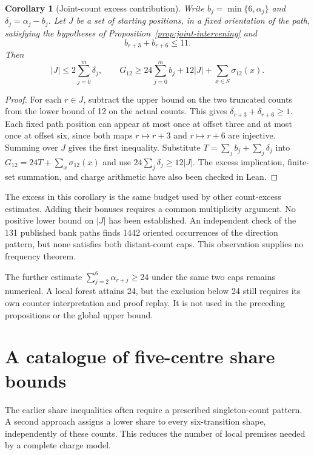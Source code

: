 \documentclass[11pt,a4paper]{article}
\newtheorem{corollary}[theorem]{Corollary}
\theoremstyle{definition}
\theoremstyle{remark}
\begin{document}
\begin{corollary}[Joint-count excess contribution]\label{cor:joint-intervening-excess}
Write $b_j=\min\{6,\alpha_j\}$ and $\delta_j=\alpha_j-b_j$. Let $J$ be a set of starting positions, in a fixed orientation of the path, satisfying the hypotheses of Proposition~\ref{prop:joint-intervening} and
\[
b_{r+3}+b_{r+6}\le11.
\]
Then
\[
|J|\le2\sum_{j=0}^{m}\delta_j,
\qquad
G_{12}\ge24\sum_{j=0}^{m}b_j+12|J|+\sum_{x\in S}\sigma_{12}(x).
\]
\end{corollary}
\begin{proof}
For each $r\in J$, subtract the upper bound on the two truncated counts from the lower bound of 12 on the actual counts. This gives $\delta_{r+3}+\delta_{r+6}\ge1$. Each fixed path position can appear at most once at offset three and at most once at offset six, since both maps $r\mapsto r+3$ and $r\mapsto r+6$ are injective. Summing over $J$ gives the first inequality. Substitute $T=\sum_j b_j+\sum_j\delta_j$ into $G_{12}=24T+\sum_x\sigma_{12}(x)$ and use $24\sum_j\delta_j\ge12|J|$. The excess implication, finite-set summation, and charge arithmetic have also been checked in Lean.
\end{proof}

The excess in this corollary is the same budget used by other count-excess estimates. Adding their bonuses requires a common multiplicity argument. No positive lower bound on $|J|$ has been established. An independent check of the 131 published bank paths finds 1442 oriented occurrences of the direction pattern, but none satisfies both distant-count caps. This observation supplies no frequency theorem.

The further estimate $\sum_{j=2}^{6}\alpha_{r+j}\ge24$ under the same two caps remains numerical. A local forest attains 24, but the exclusion below 24 still requires its own counter interpretation and proof replay. It is not used in the preceding propositions or the global upper bound.

\section{A catalogue of five-centre share bounds}\label{sec:countfree-catalogue}
The earlier share inequalities often require a prescribed singleton-count pattern. A second approach assigns a lower share to every six-transition shape, independently of these counts. This reduces the number of local premises needed by a complete charge model.
\end{document}
